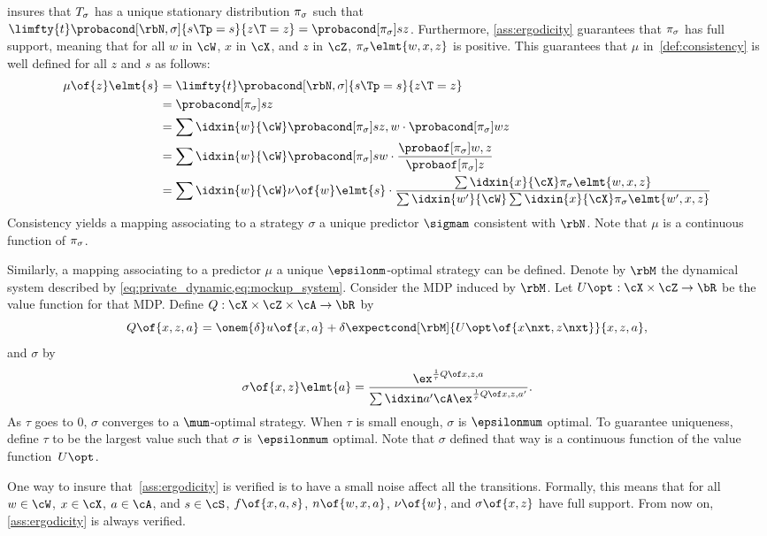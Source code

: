  insures that \(T_{\sigma}\) has a unique stationary distribution \(\pi_{\sigma}\) such that \(\limfty{t}\probacond[\rbN, \sigma]{s\Tp = s}{z\T = z} = \probacond[\pi\strat{\sigma}]{s}{z}\).
Furthermore, \cref{ass:ergodicity} guarantees that \(\pi_{\sigma}\) has full support, meaning that for all \(w\) in \(\cW\), \(x\) in \(\cX\), and \(z\) in \(\cZ\), \(\pi\strat{\sigma}\elmt{w,x,z}\) is positive.
This guarantees that \(\mu\) in~\cref{def:consistency} is well defined for all \(z\) and \(s\) as follows:
\begin{align*}
\mu \of{z} \elmt{s}
&= \limfty{t}\probacond[\rbN, \sigma]{s\Tp = s}{z\T = z} \\
&= \probacond[\pi\strat{\sigma}]{s}{z} \\
&= \sum\idxin{w}{\cW} \probacond[\pi\strat{\sigma}]{s}{z, w} \cdot \probacond[\pi\strat{\sigma}]{w}{z} \\
&= \sum\idxin{w}{\cW} \probacond[\pi\strat{\sigma}]{s}{w} \cdot \frac{\probaof[\pi\strat{\sigma}]{w, z}}{\probaof[\pi\strat{\sigma}]{z}} \\
&= \sum\idxin{w}{\cW} \nu\of{w}\elmt{s} \cdot \frac{\sum\idxin{x}{\cX} \pi\strat{\sigma}\elmt{w,x,z}}{\sum\idxin{w'}{\cW}\sum\idxin{x}{\cX} \pi\strat{\sigma}\elmt{w',x,z}}
\end{align*}
Consistency yields a mapping associating to a strategy \(\sigma\) a unique predictor \(\sigmam\) consistent with \(\rbN\).
Note that \(\mu\) is a continuous function of \(\pi_{\sigma}\).

Similarly, a mapping associating to a predictor \(\mu\) a unique \(\epsilonm\)-optimal strategy can be defined.
Denote by \(\rbM\) the dynamical system described by \cref{eq:private_dynamic,eq:mockup_system}.
Consider the MDP induced by \(\rbM\).
Let \(\Uopt : \cX \times \cZ \to \bR\) be the value function for that MDP.
Define \(Q : \cX \times \cZ \times \cA \to \bR\) by
\[
Q \of{x, z, a} = \onem{\delta} u \of{x, a} + \delta \expectcond[\rbM]{\Uopt \of{x\nxt, z\nxt}}{x, z, a},
\]
and \(\sigma\) by
\[
\sigma \of{x, z} \elmt{a} = \gibbsQ.
\]
As \(\tau\) goes to \(0\), \(\sigma\) converges to a \(\mum\)-optimal strategy.
When \(\tau\) is small enough, \(\sigma\) is \(\epsilonmum\) optimal.
To guarantee uniqueness, define \(\tau\) to be the largest value such that \(\sigma\) is \(\epsilonmum\) optimal.
Note that \(\sigma\) defined that way is a continuous function of the value function~\(\Uopt\).

One way to insure that~\cref{ass:ergodicity} is verified is to have a small noise affect all the transitions.
Formally, this means that for all \(w \in \cW\), \(x \in \cX\), \(a \in \cA\), and \(s \in \cS\), \(f \of{x, a, s}\), \(n \of{w, x, a}\), \(\nu \of{w}\), and \(\sigma \of{x, z}\) have full support.
From now on, \cref{ass:ergodicity} is always verified.

